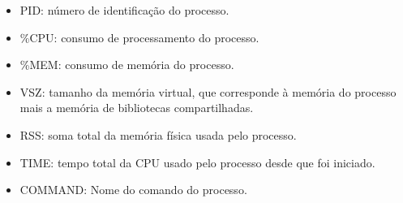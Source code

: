 
\begin{itemize}
    \item PID: número de identificação do processo.
    
    \item \%CPU: consumo de processamento do processo.
    
    \item \%MEM: consumo de memória do processo.
     
    \item VSZ: tamanho da memória virtual, que corresponde à memória do processo mais a memória de bibliotecas compartilhadas.
    
    \item RSS: soma total da memória física usada pelo processo.
    
    \item TIME: tempo total da CPU usado pelo processo desde que foi iniciado.
        
    \item COMMAND: Nome do comando do processo.

\end{itemize}

